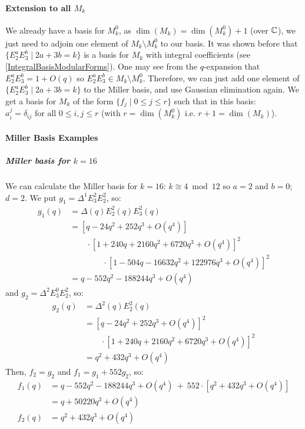 \paragraph{Extension to all $M_k$}
We already have a basis for $M_k^0$, as $\dim(M_k) = \dim(M_k^0) + 1$ (over $\mathbb{C}$), we just need to adjoin one element of $M_k \setminus M_k^0$ to our basis.
It was shown before that $\{E_2^aE_3^b \mid 2a+3b=k\}$ is a basis for $M_k$ with integral coefficients (see \ref{IntegralBasisModularForms}).
One may see from the $q$-expansion that $E_2^aE_3^b = 1 + O(q)$ so $E_2^aE_3^b \in M_k \setminus M_k^0$.
Therefore, we can just add one element of $\{E_2^aE_3^b \mid 2a+3b = k\}$ to the Miller basis, and use Gaussian elimination again.
We get a basis for $M_k$ of the form $\{f_j \mid 0 \leq j \leq r \}$ such that in this basis: $a_i^j = \delta_{ij} \text{ for all } 0 \leq i,j \leq r$ (with $r=\dim(M_k^0)$ i.e. $r+1=\dim(M_k)$).

\paragraph{Miller Basis Examples}
\subparagraph{Miller basis for $k=16$}
We can calculate the Miller basis for $k=16$:
$k \cong 4 \bmod 12$ so $a=2$ and $b=0$; $d=2$.
We put $g_1 = \Delta^1E_3^2E_2^2$, so:
\begin{align*}
    g_1(q) &= \Delta(q)E_2^2(q)E_3^2(q)\\
           &= \left[ q - 24q^2 + 252q^3 + O(q^4) \right]\\
           & \qquad \cdot \left[ 1 + 240q + 2160q^2 + 6720q^3 + O(q^4) \right]^2\\
           & \qquad \qquad \cdot \left[ 1 - 504q - 16632q^2 + 122976q^3 + O(q^4) \right]^2\\
           &= q - 552q^2 - 188244q^3 + O(q^4)
\end{align*}
and $g_2 = \Delta^2E_3^0E_2^2$, so:
\begin{align*}
    g_2(q) &= \Delta^2(q)E_2^2(q)\\
           &= \left[ q - 24q^2 + 252q^3 + O(q^4) \right]^2\\
           & \qquad \cdot \left[ 1 + 240q + 2160q^2 + 6720q^3 + O(q^4) \right]^2\\
           &= q^2 + 432q^3 + O(q^4)
\end{align*}
Then, $f_2=g_2$ and $f_1=g_1+552g_2$, so:
\begin{align*}
    f_1(q) &= q - 552q^2 - 188244q^3 + O(q^4) \ + \ 552 \cdot \left[q^2 + 432q^3 + O(q^4)\right] \\
           &= q + 50220q^3 + O(q^4)\\
    f_2(q) &= q^2 + 432q^3 + O(q^4)\\
\end{align*}

